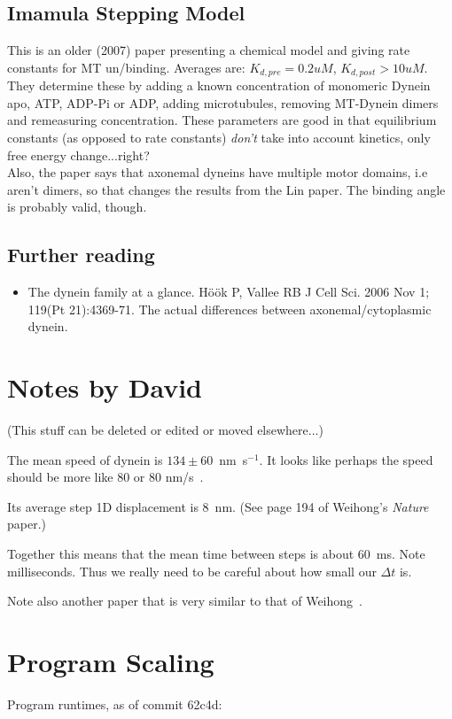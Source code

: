\documentclass[10pt]{article} %
\begin{document}
\subsection{Imamula Stepping Model}
This is an older (2007) paper presenting a chemical model and giving rate constants for MT un/binding. Averages are: $K_{d,pre} = 0.2uM$, $K_{d,post} > 10uM$. They determine these by adding a known concentration of monomeric Dynein apo, ATP, ADP-Pi or ADP, adding microtubules, removing MT-Dynein dimers and remeasuring concentration. These parameters are good in that equilibrium constants (as opposed to rate constants) \textit{don't} take into account kinetics, only free energy change...right?\\

Also, the paper says that axonemal dyneins have multiple motor domains, i.e aren't dimers, so that changes the results from the Lin paper. The binding angle is probably valid, though.\\

\subsection{Further reading}
\begin{itemize}
\item The dynein family at a glance. Höök P, Vallee RB J Cell Sci. 2006 Nov 1; 119(Pt 21):4369-71. The actual differences between axonemal/cytoplasmic dynein.
\end{itemize}

\section{Notes by David}
(This stuff can be deleted or edited or moved elsewhere...)

The mean speed of dynein is $134\pm 60$~nm~s$^{-1}$.  It looks like
perhaps the speed should be more like 80 or 80 nm/s~\cite{reck2006single}.

Its average step 1D displacement is 8~nm. (See page 194 of Weihong's \emph{Nature} paper.)

Together this means that the mean time between steps is about 60~ms.
Note milliseconds.  Thus we really need to be careful about how small
our $\Delta t$ is.

Note also another paper that is very similar to that of Weihong~\cite{dewitt2012cytoplasmic}.

\section{Program Scaling}
Program runtimes, as of commit 62c4d:
\end{document}

